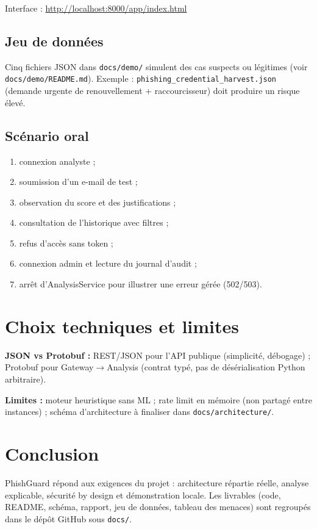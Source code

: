 \documentclass[11pt,a4paper]{article}
\begin{document}
Interface : \url{http://localhost:8000/app/index.html}

\subsection{Jeu de données}

Cinq fichiers JSON dans \texttt{docs/demo/} simulent des cas suspects ou légitimes
(voir \texttt{docs/demo/README.md}). Exemple : \texttt{phishing\_credential\_harvest.json}
(demande urgente de renouvellement + raccourcisseur) doit produire un risque élevé.

\subsection{Scénario oral}

\begin{enumerate}
  \item connexion analyste ;
  \item soumission d'un e-mail de test ;
  \item observation du score et des justifications ;
  \item consultation de l'historique avec filtres ;
  \item refus d'accès sans token ;
  \item connexion admin et lecture du journal d'audit ;
  \item arrêt d'AnalysisService pour illustrer une erreur gérée (502/503).
\end{enumerate}

\section{Choix techniques et limites}

\textbf{JSON vs Protobuf :} REST/JSON pour l'API publique (simplicité, débogage) ;
Protobuf pour Gateway$\rightarrow$Analysis (contrat typé, pas de désérialisation Python arbitraire).

\textbf{Limites :} moteur heuristique sans ML ; rate limit en mémoire (non partagé entre
instances) ; schéma d'architecture à finaliser dans \texttt{docs/architecture/}.

\section{Conclusion}

PhishGuard répond aux exigences du projet : architecture répartie réelle, analyse
explicable, sécurité by design et démonstration locale. Les livrables (code, README,
schéma, rapport, jeu de données, tableau des menaces) sont regroupés dans le dépôt
GitHub sous \texttt{docs/}.
\end{document}
